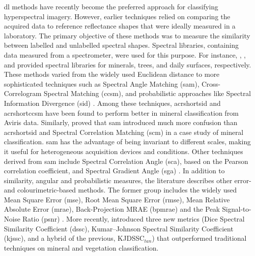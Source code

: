 \acrshort{dl} methods have recently become the preferred approach for classifying hyperspectral imagery. However, earlier techniques relied on comparing the acquired data to reference reflectance shapes that were ideally measured in a laboratory. The primary objective of these methods was to measure the similarity between labelled and unlabelled spectral shapes. Spectral libraries, containing data measured from a spectrometer, were used for this purpose. For instance, \cite{kokaly_usgs_2017}, \cite{dutta_characterizing_2017}, and \cite{matusik_data-driven_2003} provided spectral libraries for minerals, trees, and daily surfaces, respectively. These methods varied from the widely used Euclidean distance to more sophisticated techniques such as Spectral Angle Matching (\acrshort{sam}), Cross-Correlogram Spectral Matching (\acrshort{ccsm}), and probabilistic approaches like Spectral Information Divergence (\acrshort{sid}) \cite{pu_hyperspectral_2017}. Among these techniques, acrshort{sid} and acrshort{ccsm} have been found to perform better in mineral classification from Aviris data. Similarly, \cite{van_der_meer_effectiveness_2006} proved that \acrshort{sam} introduced much more confusion than acrshort{sid} and Spectral Correlation Matching (\acrshort{scm}) in a case study of mineral classification. \acrshort{sam} has the advantage of being invariant to different scales, making it useful for heterogeneous acquisition devices and conditions. Other techniques derived from \acrshort{sam} include Spectral Correlation Angle (\acrshort{sca}), based on the Pearson correlation coefficient, and Spectral Gradient Angle (\acrshort{sga}) \cite{ren_novel_2022}. In addition to similarity, angular and probabilistic measures, the literature describes other error- and colourimetric-based methods. The former group includes the widely used Mean Square Error (\acrshort{mse}), Root Mean Square Error (\acrshort{rmse}), Mean Relative Absolute Error (\acrshort{mrae}), Back-Projection MRAE (\acrshort{bpmrae}) and the Peak Signal-to-Noise Ratio (\acrshort{psnr}) \cite{agarla_analysis_2021}. More recently, \cite{kumar_new_2021} introduced three new metrics (Dice Spectral Similarity Coefficient (\acrshort{dssc}), Kumar–Johnson Spectral Similarity Coefficient (\acrshort{kjssc}), and a hybrid of the previous, KJDSSC$_{\textit{tan}}$) that outperformed traditional techniques on mineral and vegetation classification.

